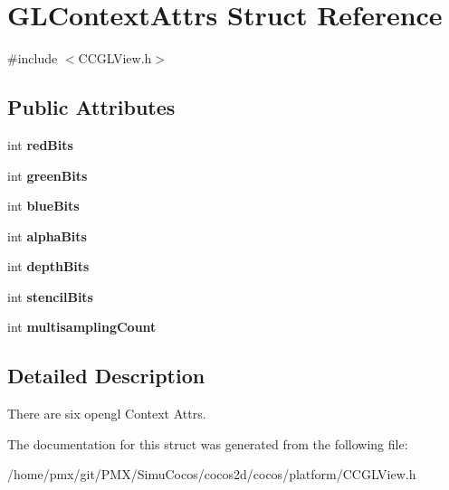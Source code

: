 \hypertarget{structGLContextAttrs}{}\section{G\+L\+Context\+Attrs Struct Reference}
\label{structGLContextAttrs}


{\ttfamily \#include $<$C\+C\+G\+L\+View.\+h$>$}

\subsection*{Public Attributes}
\begin{DoxyCompactItemize}
\item 
\mbox{\label{structGLContextAttrs_afc8b6cd83c9ea96a763bccc810ad8107}} 
int {\bfseries red\+Bits}
\item 
\mbox{\label{structGLContextAttrs_abde950c439159aaf66e7216668966b3f}} 
int {\bfseries green\+Bits}
\item 
\mbox{\label{structGLContextAttrs_a04f5dd74230919465c0a32924de7bf87}} 
int {\bfseries blue\+Bits}
\item 
\mbox{\label{structGLContextAttrs_a8743e4b21bedd4a18e6ee46274fa1da6}} 
int {\bfseries alpha\+Bits}
\item 
\mbox{\label{structGLContextAttrs_a508c62e0d2ecadef19aed3d7a28a9be7}} 
int {\bfseries depth\+Bits}
\item 
\mbox{\label{structGLContextAttrs_ac501f0fb86df78f7ba222c03406801ec}} 
int {\bfseries stencil\+Bits}
\item 
\mbox{\label{structGLContextAttrs_a98f98e20793eeb3e03605dfbec76eabb}} 
int {\bfseries multisampling\+Count}
\end{DoxyCompactItemize}


\subsection{Detailed Description}
There are six opengl Context Attrs. 

The documentation for this struct was generated from the following file\+:\begin{DoxyCompactItemize}
\item 
/home/pmx/git/\+P\+M\+X/\+Simu\+Cocos/cocos2d/cocos/platform/C\+C\+G\+L\+View.\+h\end{DoxyCompactItemize}
